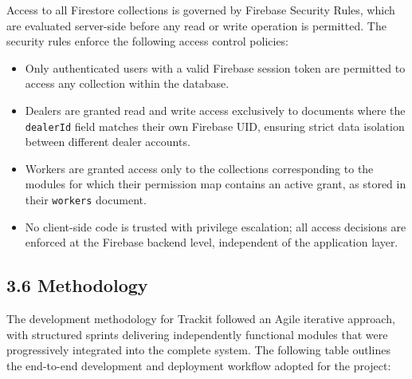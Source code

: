 \documentclass[12pt, oneside]{article}
\begin{document}
Access to all Firestore collections is governed by Firebase Security Rules, which are evaluated server-side before any read or write operation is permitted. The security rules enforce the following access control policies:

\begin{itemize}
    \item Only authenticated users with a valid Firebase session token are permitted to access any collection within the database.
    \item Dealers are granted read and write access exclusively to documents where the \texttt{dealerId} field matches their own Firebase UID, ensuring strict data isolation between different dealer accounts.
    \item Workers are granted access only to the collections corresponding to the modules for which their permission map contains an active grant, as stored in their \texttt{workers} document.
    \item No client-side code is trusted with privilege escalation; all access decisions are enforced at the Firebase backend level, independent of the application layer.
\end{itemize}

\subsection*{3.6 Methodology}

The development methodology for Trackit followed an Agile iterative approach, with structured sprints delivering independently functional modules that were progressively integrated into the complete system. The following table outlines the end-to-end development and deployment workflow adopted for the project:
\end{document}
